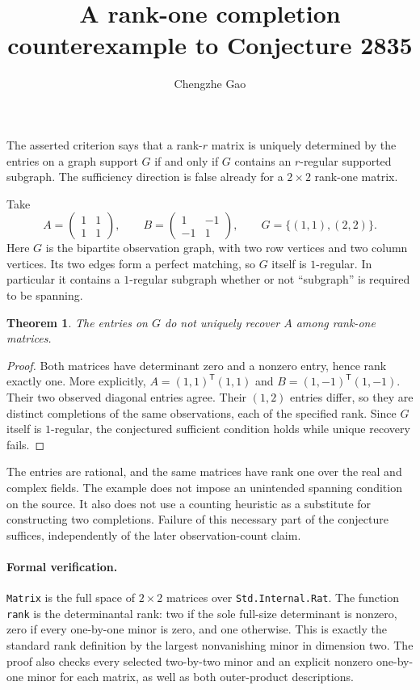 \documentclass[11pt]{article}
\newtheorem{theorem}{Theorem}
\begin{document}
\title{A rank-one completion counterexample to Conjecture 2835}
\author{Chengzhe Gao}\date{}\maketitle
The asserted criterion says that a rank-$r$ matrix is uniquely determined
by the entries on a graph support $G$ if and only if $G$ contains an
$r$-regular supported subgraph. The sufficiency direction is false already
for a $2\times2$ rank-one matrix.

Take
\[
 A=\begin{pmatrix}1&1\\1&1\end{pmatrix},\qquad
 B=\begin{pmatrix}1&-1\\-1&1\end{pmatrix},\qquad
 G=\{(1,1),(2,2)\}.
\]
Here $G$ is the bipartite observation graph, with two row vertices and two
column vertices. Its two edges form a perfect matching, so $G$ itself is
$1$-regular. In particular it contains a $1$-regular subgraph whether or
not ``subgraph'' is required to be spanning.

\begin{theorem}
The entries on $G$ do not uniquely recover $A$ among rank-one matrices.
\end{theorem}
\begin{proof}
Both matrices have determinant zero and a nonzero entry, hence rank exactly
one. More explicitly,
$A=(1,1)^{\mathsf T}(1,1)$ and
$B=(1,-1)^{\mathsf T}(1,-1)$.
Their two observed diagonal entries agree. Their $(1,2)$ entries differ,
so they are distinct completions of the same observations, each of the
specified rank. Since $G$ itself is $1$-regular, the conjectured sufficient
condition holds while unique recovery fails.
\end{proof}

The entries are rational, and the same matrices have rank one over the
real and complex fields. The example does not impose an unintended
spanning condition on the source. It also does not use a counting heuristic
as a substitute for constructing two completions. Failure of this necessary
part of the conjecture suffices, independently of the later observation-count
claim.

\paragraph{Formal verification.}
\texttt{Matrix} is the full space of $2\times2$ matrices over
\texttt{Std.Internal.Rat}. The function \texttt{rank} is the determinantal
rank: two if the sole full-size determinant is nonzero, zero if every
one-by-one minor is zero, and one otherwise. This is exactly the standard
rank definition by the largest nonvanishing minor in dimension two.
The proof also checks every selected two-by-two minor and an explicit
nonzero one-by-one minor for each matrix, as well as both outer-product
descriptions.
\end{document}
